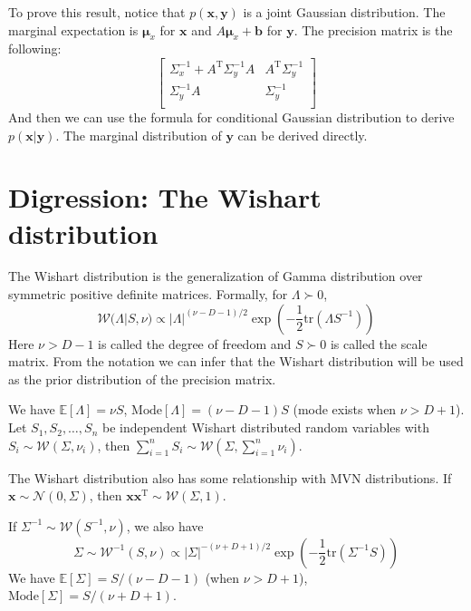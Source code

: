\documentclass[openany]{book}
\begin{document}
To prove this result, notice that $p(\mathbf{x},\mathbf{y})$ is a joint Gaussian distribution. The marginal expectation is $\boldsymbol{\mu}_x$ for $\mathbf{x}$ and $A\boldsymbol{\mu}_x+\mathbf{b}$ for $\mathbf{y}$. The precision matrix is the following:
\begin{equation}
\left[
\begin{array}{cc}
\Sigma_x^{-1}+A^{\mathrm{T}}\Sigma_y^{-1}A & A^{\mathrm{T}}\Sigma_y^{-1} \\
\Sigma_y^{-1}A & \Sigma_y^{-1} \\
\end{array}
\right]
\end{equation}
And then we can use the formula for conditional Gaussian distribution to derive $p(\mathbf{x}|\mathbf{y})$. The marginal distribution of $\mathbf{y}$ can be derived directly.

\section{Digression: The Wishart distribution}
The Wishart distribution is the generalization of Gamma distribution over symmetric positive definite matrices. Formally, for $\Lambda\succ0$,
\begin{equation}\label{wishart}
\mathcal{W}(\Lambda|S,\nu)\propto|\Lambda|^{(\nu-D-1)/2}\exp\left(-\frac{1}{2}\mathrm{tr}(\Lambda S^{-1})\right)
\end{equation}
Here $\nu>D-1$ is called the degree of freedom and $S\succ0$ is called the scale matrix. From the notation we can infer that the Wishart distribution will be used as the prior distribution of the precision matrix.

We have $\mathbb{E}[\Lambda]=\nu S$, $\mathrm{Mode}[\Lambda]=(\nu-D-1)S$ (mode exists when $\nu>D+1$). Let $S_1,S_2,\ldots,S_n$ be independent Wishart distributed random variables with $S_i\sim\mathcal{W}(\Sigma,\nu_i)$, then $\sum_{i=1}^nS_i\sim\mathcal{W}(\Sigma,\sum_{i=1}^n\nu_i)$.

The Wishart distribution also has some relationship with MVN distributions. If $\mathbf{x}\sim\mathcal{N}(0,\Sigma)$, then $\mathbf{x}\mathbf{x}^{\mathrm{T}}\sim\mathcal{W}(\Sigma,1)$.

If $\Sigma^{-1}\sim\mathcal{W}(S^{-1},\nu)$, we also have
\begin{equation}\label{invwishart}
\Sigma\sim\mathcal{W}^{-1}(S,\nu)\propto|\Sigma|^{-(\nu+D+1)/2}\exp\left(-\frac{1}{2}\mathrm{tr}(\Sigma^{-1}S)\right)
\end{equation}
We have $\mathbb{E}[\Sigma]=S/(\nu-D-1)$ (when $\nu>D+1$), $\mathrm{Mode}[\Sigma]=S/(\nu+D+1)$.
\end{document}
